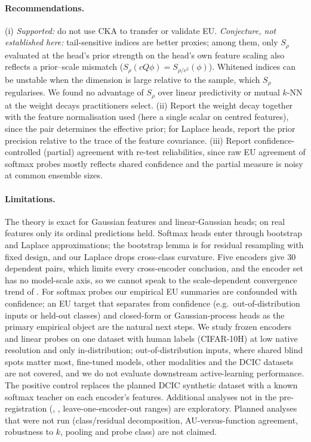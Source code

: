 \documentclass[twoside]{article}
\theoremstyle{definition}
\theoremstyle{remark}
\newcommand{\Srho}{S_{\rho}}
\begin{document}
\paragraph{Recommendations.}
(i) \emph{Supported:} do not use CKA to transfer or validate EU. \emph{Conjecture, not established here:} tail-sensitive indices are better proxies; among them, only $\Srho$ evaluated at the head's prior strength on the head's own feature scaling also reflects a prior--scale mismatch ($\Srho(cQ\phi)=S_{\rho/c^2}(\phi)$). Whitened indices can be unstable when the dimension is large relative to the sample, which $\Srho$ regularises. We found no advantage of $\Srho$ over linear predictivity or mutual $k$-NN at the weight decays practitioners select.
(ii) Report the weight decay together with the feature normalisation used (here a single scalar on centred features), since the pair determines the effective prior; for Laplace heads, report the prior precision relative to the trace of the feature covariance.
(iii) Report confidence-controlled (partial) agreement with re-test reliabilities, since raw EU agreement of softmax probes mostly reflects shared confidence and the partial measure is noisy at common ensemble sizes.

\paragraph{Limitations.}
The theory is exact for Gaussian features and linear-Gaussian heads; on real features only its ordinal predictions held.
Softmax heads enter through bootstrap and Laplace approximations; the bootstrap lemma is for residual resampling with fixed design, and our Laplace drops cross-class curvature.
Five encoders give 30 dependent pairs, which limits every cross-encoder conclusion, and the encoder set has no model-scale axis, so we cannot speak to the scale-dependent convergence trend of \citet{huh2024platonic}.
For softmax probes our empirical EU summaries are confounded with confidence; an EU target that separates from confidence (e.g.\ out-of-distribution inputs or held-out classes) and closed-form or Gaussian-process heads as the primary empirical object are the natural next steps.
We study frozen encoders and linear probes on one dataset with human labels (CIFAR-10H) at low native resolution and only in-distribution; out-of-distribution inputs, where shared blind spots matter most, fine-tuned models, other modalities and the DCIC datasets are not covered, and we do not evaluate downstream active-learning performance.
The positive control replaces the planned DCIC synthetic dataset with a known softmax teacher on each encoder's features.
Additional analyses not in the pre-registration (, , leave-one-encoder-out ranges) are exploratory.
Planned analyses that were not run (class/residual decomposition, AU-versus-function agreement, robustness to $k$, pooling and probe class) are not claimed.
\end{document}

